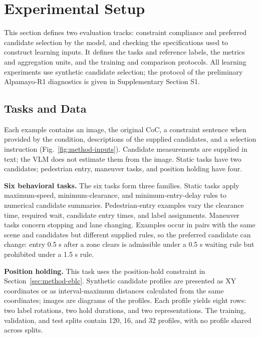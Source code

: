 \section{Experimental Setup}\label{sec:experimental-setup}

This section defines two evaluation tracks: constraint compliance and preferred
candidate selection by the model, and checking the specifications used to
construct learning inputs. It defines the tasks and reference labels, the
metrics and aggregation units, and the training and comparison protocols.
All learning experiments use synthetic candidate selection; the protocol of
the preliminary Alpamayo-R1 diagnostics is given in Supplementary Section S1.

\subsection{Tasks and Data}\label{sec:setup-data}

Each example contains an image, the original CoC, a constraint sentence when
provided by the condition, descriptions of the supplied candidates, and a selection
instruction (Fig.~\ref{fig:method-inputs}). Candidate measurements are supplied
in text; the VLM does not estimate them from the image. Static tasks have two
candidates; pedestrian entry, maneuver tasks, and position holding have four.

\noindent\textbf{Six behavioral tasks.}
The six tasks form three families. Static tasks apply maximum-speed,
minimum-clearance, and minimum-entry-delay rules to numerical candidate
summaries. Pedestrian-entry examples vary the clearance time, required wait,
candidate entry times, and label assignments. Maneuver tasks concern stopping
and lane changing. Examples occur in pairs with the same scene and candidates
but different supplied rules, so the preferred candidate can change: entry 0.5 s
after a zone clears is admissible under a 0.5 s waiting rule but prohibited
under a 1.5 s rule.

\noindent\textbf{Position holding.}
This task uses the position-hold constraint in Section~\ref{sec:method-eblc}. Synthetic
candidate profiles are presented as XY coordinates or as interval-maximum
distances calculated from the same coordinates; images are diagrams of the
profiles. Each profile yields eight rows: two label rotations, two hold
durations, and two representations. The training, validation, and test splits
contain 120, 16, and 32 profiles, with no profile shared across splits.

